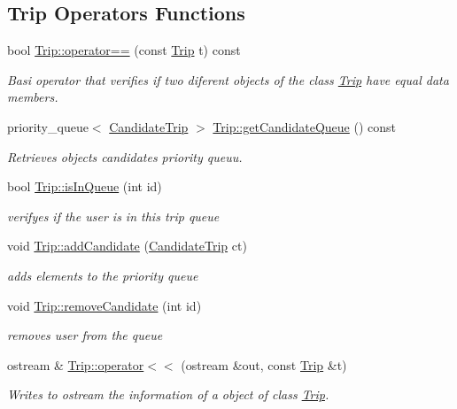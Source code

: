 \subsection*{Trip Operators Functions}
\begin{DoxyCompactItemize}
\item 
bool \hyperlink{group___trip_ga1462791c70b237e595244b16e086850f}{Trip\+::operator==} (const \hyperlink{class_trip}{Trip} t) const
\begin{DoxyCompactList}\small\item\em Basi operator that verifies if two diferent objects of the class \hyperlink{class_trip}{Trip} have equal data members. \end{DoxyCompactList}\item 
priority\+\_\+queue$<$ \hyperlink{class_candidate_trip}{Candidate\+Trip} $>$ \hyperlink{group___trip_ga1c016b992e17387a25ec9f7e545a6594}{Trip\+::get\+Candidate\+Queue} () const
\begin{DoxyCompactList}\small\item\em Retrieves object\textquotesingle{}s candidates priority queuu. \end{DoxyCompactList}\item 
bool \hyperlink{group___trip_gaa704cf099858e8de479f6fdd6229008f}{Trip\+::is\+In\+Queue} (int id)
\begin{DoxyCompactList}\small\item\em verifyes if the user is in this trip queue \end{DoxyCompactList}\item 
void \hyperlink{group___trip_ga6879d39109d9b024461c9edb58c8b1dd}{Trip\+::add\+Candidate} (\hyperlink{class_candidate_trip}{Candidate\+Trip} ct)
\begin{DoxyCompactList}\small\item\em adds elements to the priority queue \end{DoxyCompactList}\item 
void \hyperlink{group___trip_ga5c0fbf9c2320dc4799896295788eff9e}{Trip\+::remove\+Candidate} (int id)
\begin{DoxyCompactList}\small\item\em removes user from the queue \end{DoxyCompactList}\item 
ostream \& \hyperlink{group___trip_gaeae00f4e739b064d8261c91d62cde34a}{Trip\+::operator$<$$<$} (ostream \&out, const \hyperlink{class_trip}{Trip} \&t)
\begin{DoxyCompactList}\small\item\em Writes to ostream the information of a object of class \hyperlink{class_trip}{Trip}. \end{DoxyCompactList}\end{DoxyCompactItemize}


